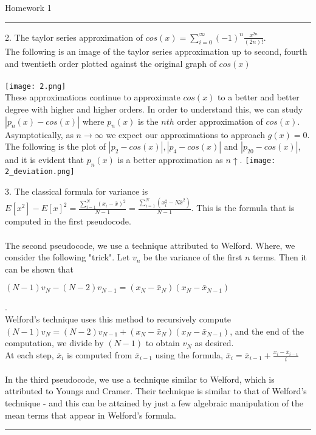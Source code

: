 \documentclass[12pt]{article}
\begin{document}
	
	\begin{center}
		Homework 1
	\end{center} 
	{\rule{\linewidth}{0.1mm} }
	
	2. The taylor series approximation of $cos(x) = \sum\limits_{i=0}^{\infty} (-1)^n \frac{x^{2n}}{(2n)!}$. \\
	\indent The following is an image of the taylor series approximation up to second, fourth and twentieth order plotted against the original graph of $cos(x)$\\\\
	\texttt{[image: 2.png]}\\
	\indent These approximations continue to approximate $cos(x)$ to a better and better degree with higher and higher orders. In order to understand this, we can study $|p_n(x)-cos(x)|$ where $p_n(x)$ is the $nth$ order approximation of $cos(x)$. Asymptotically, as $n \rightarrow \infty$ we expect our approximations to approach $g(x) = 0$. The following is the plot of $|p_2-cos(x)|, |p_4-cos(x)|$ and $|p_{20}-cos(x)|$, and it is evident that $p_n(x)$ is a better approximation as $n \uparrow$.
	\texttt{[image: 2\_deviation.png]}\\
	
	\newpage
	
	3. The classical formula for variance is $E[x^2] - {E[x]}^2 = \frac{\sum_{i=1}^{N}(x_i - \bar{x})^2}{N-1} = \frac{\sum_{i=1}^{N}(x_i^2 - N\bar{x}^2)}{N-1} $. This is the formula that is computed in the first pseudocode. \\\\
	The second pseudocode, we use a technique attributed to Welford. Where, we consider the following "trick". Let $v_n$ be the variance of the first $n$ terms. Then it can be shown that \\
	\begin{center}$(N-1)v_N - (N-2)v_{N-1} = (x_N - \bar{x}_N)(x_N - \bar{x}_{N-1})$ \end{center}. \\ Welford's technique uses this method to recursively compute \\ $(N-1)v_N = (N-2)v_{N-1} + (x_N - \bar{x}_N)(x_N - \bar{x}_{N-1})$, and the end of the computation, we divide by $(N-1)$ to obtain $v_N$ as desired. \\ At each step, $\bar{x}_i$ is computed from $\bar{x}_{i-1}$ using the formula, $\bar{x}_i = \bar{x}_{i-1} + \frac{x_i-\bar{x}_{i-1}}{i}$
	\\\\
	In the third pseudocode, we use a technique similar to Welford, which is attributed to Youngs and Cramer. Their technique is similar to that of Welford's technique - and this can be attained by just a few algebraic manipulation of the mean terms that appear in Welford's formula. \\
		{\rule{\linewidth}{0.1mm} }\\
	 
\end{document}
